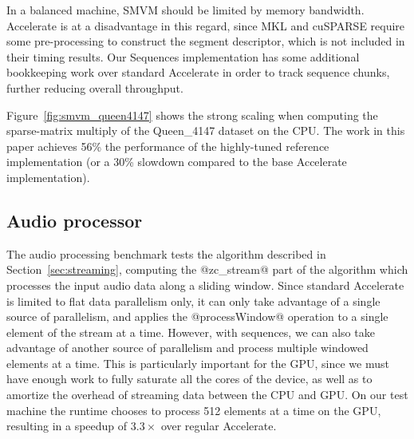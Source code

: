 In a balanced machine, SMVM should be limited by memory bandwidth. Accelerate is
at a disadvantage in this regard, since MKL and cuSPARSE require some
pre-processing to construct the segment descriptor, which is not included in
their timing results. Our Sequences implementation has some additional
bookkeeping work over standard Accelerate in order to track sequence chunks,
further reducing overall throughput.


Figure~\ref{fig:smvm_queen4147} shows the strong scaling when computing the
sparse-matrix multiply of the Queen\_4147 dataset on the CPU. The work in this
paper achieves 56\% the performance of the highly-tuned reference implementation
(or a 30\% slowdown compared to the base Accelerate implementation).



\subsection{Audio processor}

The audio processing benchmark tests the algorithm described in
Section~\ref{sec:streaming}, computing the @zc_stream@ part of the algorithm
which processes the input audio data along a sliding window. Since standard
Accelerate is limited to flat data parallelism only, it
can only take advantage of a single source of parallelism, and applies the
@processWindow@ operation to a single element of the stream at a time.
However, with sequences, we can also take advantage of another source of
parallelism and process multiple windowed elements at a time.
This is particularly important for the GPU, since we must have enough work to
fully saturate all the cores of the device, as well as to amortize the overhead
of streaming data between the CPU and GPU\@. On our test machine the runtime
chooses to process 512 elements at a time on the GPU, resulting in a speedup of
$3.3\times$ over regular Accelerate.

